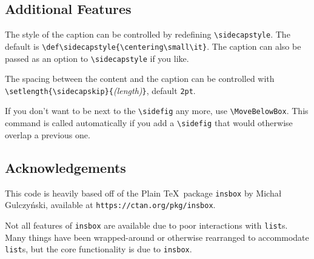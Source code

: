 \documentclass{article}
\begin{document}
	\subsection*{Additional Features}
	
	The style of the caption can be controlled by redefining \verb|\sidecapstyle|.
	The default is \verb|\def\sidecapstyle{\centering\small\it}|.
	The caption can also be passed as an option to \verb|\sidecapstyle| if you like.
	
	The spacing between the content and the caption can be controlled with \verb|\setlength{\sidecapskip}{|\emph{(length)}\verb|}|, default \verb|2pt|.
	
	If you don't want to be next to the \verb|\sidefig| any more, use \verb|\MoveBelowBox|.
	This command is called automatically if you add a \verb|\sidefig| that would otherwise overlap a previous one.
	
	\subsection*{Acknowledgements}
	
	This code is heavily based off of the Plain \TeX\ package \verb|insbox| by Micha\l{} Gulczy\'nski, available at \texttt{https://ctan.org/pkg/insbox}.
	
	Not all features of \verb|insbox| are available due to poor interactions with \verb|list|s.
	Many things have been wrapped-around or otherwise rearranged to accommodate \verb|list|s, but the core functionality is due to \verb|insbox|.
	
\end{document}
